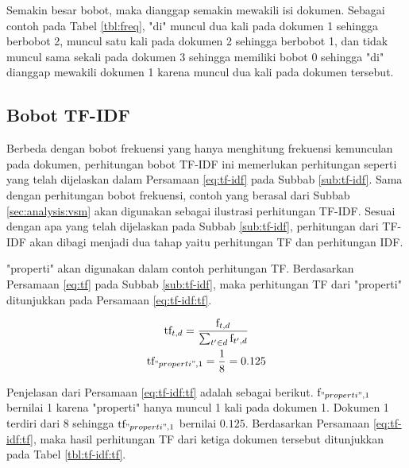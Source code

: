 Semakin besar bobot, maka \term dianggap semakin mewakili isi dokumen. Sebagai contoh pada Tabel \ref{tbl:freq}, \term "di" muncul dua kali pada dokumen 1 sehingga berbobot 2, muncul satu kali pada dokumen 2 sehingga berbobot 1, dan tidak muncul sama sekali pada dokumen 3 sehingga memiliki bobot 0 sehingga \term "di" dianggap mewakili dokumen 1 karena muncul dua kali pada dokumen tersebut.

\subsection{Bobot TF-IDF}
Berbeda dengan bobot frekuensi yang hanya menghitung frekuensi kemunculan \term pada dokumen, perhitungan bobot TF-IDF ini memerlukan perhitungan seperti yang telah dijelaskan dalam Persamaan \ref{eq:tf-idf} pada Subbab \ref{sub:tf-idf}. Sama dengan perhitungan bobot frekuensi, contoh yang berasal dari Subbab \ref{sec:analysis:vsm} akan digunakan sebagai ilustrasi perhitungan TF-IDF. Sesuai dengan apa yang telah dijelaskan pada Subbab \ref{sub:tf-idf}, perhitungan dari TF-IDF akan dibagi menjadi dua tahap yaitu perhitungan TF dan perhitungan IDF. 

\Term "properti" akan digunakan dalam contoh perhitungan TF. Berdasarkan Persamaan \ref{eq:tf} pada Subbab \ref{sub:tf-idf}, maka perhitungan TF dari \term "properti" ditunjukkan pada Persamaan \ref{eq:tf-idf:tf}.

\begin{equation}
	\label{eq:tf-idf:tf}
	\begin{gathered}
 	\textrm{tf}_{t,d}=\frac{\textrm{f}_{t,d}}{\sum_{t' \in d}\textrm{f}_{t',d}} \\
	\textrm{tf}_{"properti",1}=\frac{1}{8}=0.125
	\end{gathered}
\end{equation}

Penjelasan dari Persamaan \ref{eq:tf-idf:tf} adalah sebagai berikut. $\textrm{f}_{"properti",1}$ bernilai 1 karena \term "properti" hanya muncul 1 kali pada dokumen 1. Dokumen 1 terdiri dari 8 \term sehingga $\textrm{tf}_{"properti",1}$ bernilai $0.125$. Berdasarkan Persamaan \ref{eq:tf-idf:tf}, maka hasil perhitungan TF dari ketiga dokumen tersebut ditunjukkan pada Tabel \ref{tbl:tf-idf:tf}.

